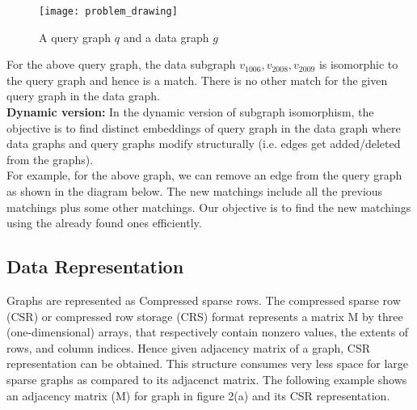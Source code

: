 \documentclass[
10pt, %
a4paper, %
oneside, %
headinclude,footinclude, %
BCOR5mm, %
]{scrartcl}
\begin{document}
\begin{figure}[h]
\centering 
\texttt{[image: problem\_drawing]} 
\caption[Subgraph Isomorphism]{A query graph $q$ and a data graph $g$} %
\label{fig:gallery} 
\end{figure}

For the above query graph, the data subgraph {$v_{1006}, v_{2008}, v_{2009}$} is isomorphic to the query graph and hence is a match. There is no other match for the given query graph in the data graph.\\

\textbf{Dynamic version:} In the dynamic version of subgraph isomorphism, the objective is to find distinct embeddings of query graph in the data graph where data graphs and query graphs modify structurally (i.e. edges get added/deleted from the graphs).\\
For example, for the above graph, we can remove an edge from the query graph as shown in the diagram below. The new matchings include all the previous matchings plus some other matchings. Our objective is to find the new matchings using the already found ones efficiently.

\subsection{Data Representation}
Graphs are represented as Compressed sparse rows\cite{csr}. The compressed sparse row (CSR) or compressed row storage (CRS) format represents a matrix M by three (one-dimensional) arrays, that respectively contain nonzero values, the extents of rows, and column indices. Hence given adjacency matrix of a graph, CSR representation can be obtained. This structure consumes very less space for large sparse graphs as compared to its adjacenct matrix. The following example shows an adjacency matrix (M) for graph in figure 2(a) and its CSR representation.\\
\end{document}
